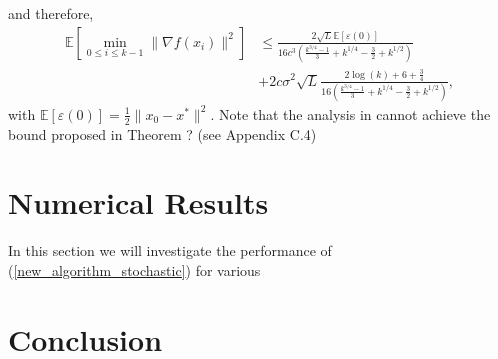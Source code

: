 \documentclass{article}
\theoremstyle{plain}
\theoremstyle{definition}
\theoremstyle{remark}
\begin{document}
and therefore,
\begin{align}
    \mathbb E\left[\min_{0\leq i\leq k-1}\|\nabla f(x_i)\|^2 \right] &\leq \frac{2\sqrt{L}\mathbb E[\varepsilon (0)]}{16c^3\left( \frac{k^{3/4}-1}{3} +k^{1/4}-\frac{3}{2}+k^{1/2}\right)}\nonumber\\
    &+2c\sigma^2\sqrt{L}\frac{2\log (k)+6+\frac{3}{4}}{16\left( \frac{k^{3/4}-1}{3} +k^{1/4}-\frac{3}{2}+k^{1/2}\right)},
\end{align}
with $\mathbb E[\varepsilon(0)]=\tfrac{1}{2}\|x_0-x^*\|^2$.
Note that the analysis in \cite{pmlr-v108-laborde20a} cannot achieve the bound proposed in Theorem ? (see \cite{pmlr-v108-laborde20a} Appendix C.4)

\begin{comment}
Interestingly, both 
discretization of 14 to nesterov and shi's ode (who used SIE) are different. why? it is interesting because they are using the same ODE but different representations. Add natural motion description. rate matching discretization? 2 Lyapunov functions for different cases.
Applying SIE on (\ref{Nes_cont_cvx_HR}) with $t_k=k+2$ gives
\begin{align}\label{Nes_cont_cvx_HR_SIE}
   \left\{ \begin{array}{ll}
    &x_{k+1}   =    x_{k} + \frac{p}{k+2}(v_k-x_k)-{s}\nabla f(x_k)\\
     &v_{k+1}    = v_k -Cp\sqrt{s}((k+2)\sqrt{s})^{p-1}\sqrt{s}\nabla f(x_{k+1}) 
    \end{array}\right.
\end{align}
Note that Nesterov accelerated gradient (NAG) for convex functions was
\begin{align}\label{Nes_cont_cvx_HR_Shi}
   \left\{ \begin{array}{ll}
    &y_{k+1}   =    x_{k} -s\nabla f(x_k)\\
     &x_{k+1}    = y_{k+1}+\frac{k}{k+3}(y_{k+1}+y_{k}) -s(\frac{k}{k+3}\nabla f(y_{k+1})-\frac{k-1}{k+3}\nabla f(y_{k})) 
    \end{array}\right.
\end{align}
Setting $p=2,C=1/4$ in (\ref{Nes_cont_cvx_HR_SIE}) we get
\begin{align}
   \left\{ \begin{array}{ll}
    &x_{k+1}   =    x_{k} + \frac{2}{k+2}(v_k-x_k)-{s}\nabla f(x_k)\\
     &v_{k+1}    = v_k -\frac{1}{2}((k+2)){s}\nabla f(x_{k+1}) 
    \end{array}\right.
\end{align}

Rate matching discretization and the expliciti dane by laborde are the same. When does rate matching becomes the same as semi implicit euler?
\end{comment}
\section{Numerical Results}\label{sec_numerical}
In this section we will investigate the performance of (\ref{new_algorithm_stochastic}) for various 
\section{Conclusion}\label{sec_conclusion}


\end{document}
